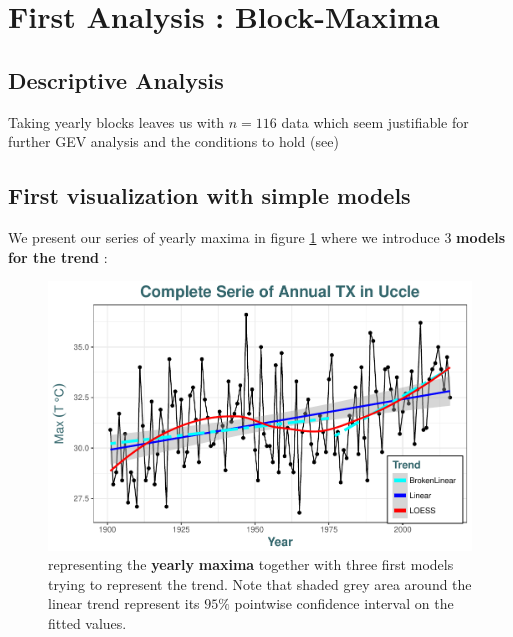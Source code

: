 \section{First Analysis : Block-Maxima}\label{sec:firstana}


\subsection{Descriptive Analysis}

Taking yearly blocks leaves us with $n=116$ data which seem justifiable for further GEV analysis and the conditions to hold (see)


\subsection{First visualization with simple models}

We present our series of yearly maxima in figure \ref{first_fig} where we introduce 3 \textbf{models for the trend} :


\begin{figure}[!htb]
	\centering\includegraphics[width=.8\linewidth]{gg12.pdf}\caption{representing the \textbf{yearly} \textbf{maxima} together with three first models trying to represent the trend. Note that shaded grey area around the linear trend represent its $95\%$ pointwise confidence interval on the fitted values. }%
\label{first_fig}
\end{figure}


